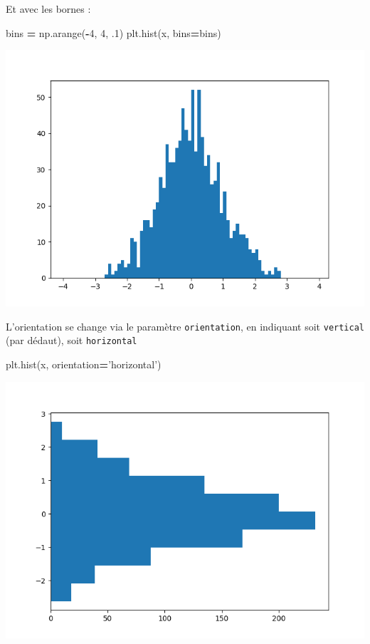 \documentclass[12pt,]{book}
\newenvironment{Shaded}{\begin{snugshade}}{\end{snugshade}}
\newcommand{\DecValTok}[1]{\textcolor[rgb]{0.00,0.00,0.81}{#1}}
\newcommand{\StringTok}[1]{\textcolor[rgb]{0.31,0.60,0.02}{#1}}
\newcommand{\OperatorTok}[1]{\textcolor[rgb]{0.81,0.36,0.00}{\textbf{#1}}}
\newcommand{\NormalTok}[1]{#1}
\numberwithin{equation}{section}
\numberwithin{countremarque}{section}
\begin{document}
Et avec les bornes :

\begin{Shaded}
\begin{Highlighting}[]
\NormalTok{bins }\OperatorTok{=}\NormalTok{ np.arange(}\OperatorTok{-}\DecValTok{4}\NormalTok{, }\DecValTok{4}\NormalTok{, .}\DecValTok{1}\NormalTok{)}
\NormalTok{plt.hist(x, bins}\OperatorTok{=}\NormalTok{bins)}
\end{Highlighting}
\end{Shaded}

\begin{center}\includegraphics[width=9.03in]{figs/pyplot/histogramme_bins_2} \end{center}

L'orientation se change via le paramètre \texttt{orientation}, en
indiquant soit \texttt{\textquotesingle{}vertical\textquotesingle{}}
(par dédaut), soit
\texttt{\textquotesingle{}horizontal\textquotesingle{}}

\begin{Shaded}
\begin{Highlighting}[]
\NormalTok{plt.hist(x, orientation}\OperatorTok{=}\StringTok{'horizontal'}\NormalTok{)}
\end{Highlighting}
\end{Shaded}

\begin{center}\includegraphics[width=9.03in]{figs/pyplot/histogramme_orientation} \end{center}
\end{document}
